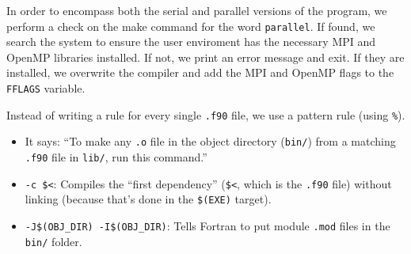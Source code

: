 In order to encompass both the serial and parallel versions of the
program, we perform a check on the make command for the word
\texttt{parallel}. If found, we search the system to ensure the user
enviroment has the necessary MPI and OpenMP libraries installed. If not,
we print an error message and exit. If they are installed, we overwrite
the compiler and add the MPI and OpenMP flags to the \texttt{FFLAGS}
variable.

\begin{Shaded}
\begin{Highlighting}[]
\NormalTok{ (,}\CharTok{$(}\KeywordTok{,}\CharTok{$(}\CharTok{))}\NormalTok{)}
   \CharTok{:=}\StringTok{ }\CharTok{$(}\CharTok{)}
  \NormalTok{ (}\CharTok{$(}\StringTok{ }\CharTok{$(}\CharTok{))}\NormalTok{,)}
    \CharTok{$(}\CharTok{)}
   \CharTok{=}
\end{Highlighting}
\end{Shaded}

Instead of writing a rule for every single \texttt{.f90} file, we use a
pattern rule (using \texttt{\%}).

\begin{Shaded}
\begin{Highlighting}[]
\ErrorTok{    }\CharTok{$(}\CharTok{)}
    \CharTok{$(}\CharTok{)} \CharTok{$(}\CharTok{)}\CharTok{$(}\CharTok{)}\CharTok{$(}\CharTok{)}\CharTok{$\textless{}}
\end{Highlighting}
\end{Shaded}

\begin{itemize}
\tightlist
\item
  It says: ``To make any \texttt{.o} file in the object directory
  (\texttt{bin/}) from a matching \texttt{.f90} file in \texttt{lib/},
  run this command.''
\item
  \texttt{-c\ \$\textless{}}: Compiles the ``first dependency''
  (\texttt{\$\textless{}}, which is the \texttt{.f90} file) without
  linking (because that's done in the \texttt{\$(EXE)} target).
\item
  \texttt{-J\$(OBJ\_DIR)\ -I\$(OBJ\_DIR)}: Tells Fortran to put module
  \texttt{.mod} files in the \texttt{bin/} folder.
\end{itemize}

